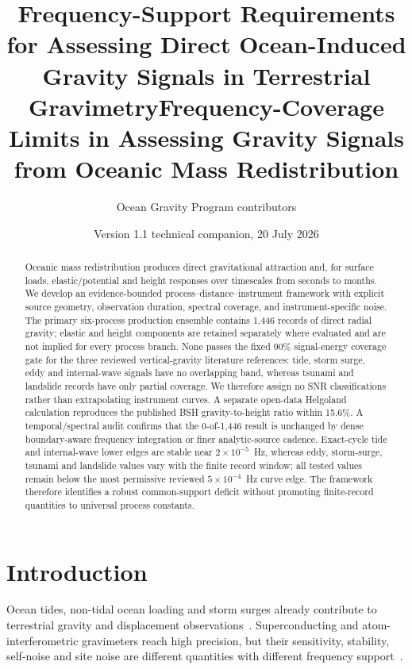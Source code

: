 \documentclass[11pt]{article}
\title{Frequency-Support Requirements for Assessing Direct Ocean-Induced Gravity Signals in Terrestrial Gravimetry}
\date{}
\title{Frequency-Coverage Limits in Assessing Gravity Signals from Oceanic Mass Redistribution}
\author{Ocean Gravity Program contributors}
\date{Version 1.1 technical companion, 20 July 2026}
\begin{document}
\maketitle

\begin{abstract}
Oceanic mass redistribution produces direct gravitational attraction and, for
surface loads, elastic/potential and height responses over timescales from
seconds to months. We develop an evidence-bounded process--distance--instrument
framework with explicit source geometry, observation duration, spectral
coverage, and instrument-specific noise. The primary six-process production
ensemble contains 1,446 records of direct radial gravity; elastic and height
components are retained separately where evaluated and are not implied for
every process branch. None passes the fixed 90\% signal-energy
coverage gate for the three reviewed vertical-gravity literature references: tide,
storm surge, eddy and internal-wave signals have no overlapping band, whereas
tsunami and landslide records have only partial coverage. We therefore assign
no
SNR classifications rather than extrapolating instrument curves. A separate
open-data Helgoland calculation reproduces the published BSH gravity-to-height
ratio within 15.6\%. A temporal/spectral audit confirms that the 0-of-1,446
result is unchanged by dense boundary-aware frequency integration or finer
analytic-source cadence. Exact-cycle tide and internal-wave lower edges are
stable near $2\times10^{-5}$~Hz, whereas eddy, storm-surge, tsunami and
landslide values vary with the finite record window; all tested values remain
below the most permissive reviewed $5\times10^{-4}$~Hz curve edge. The
framework therefore identifies a robust common-support deficit without
promoting finite-record quantities to universal process constants.
\end{abstract}

\section{Introduction}
Ocean tides, non-tidal ocean loading and storm surges already contribute to
terrestrial gravity and displacement observations~\cite{Boy2003,BoyLyard2008,
Voigt2024,Zhang2026}. Superconducting and atom-interferometric gravimeters reach
high precision, but their sensitivity, stability, self-noise and site noise are
different quantities with different frequency support~\cite{Banka1999,
Rosat2011,Schafer2020,Menoret2018,Peters2001}.
\end{document}
